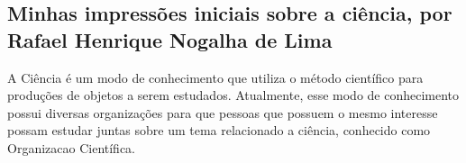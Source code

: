 \subsection{Minhas impressões iniciais sobre a ciência, por Rafael Henrique Nogalha de Lima}


A Ciência é um modo de conhecimento que utiliza o método científico para produções de objetos a serem estudados. Atualmente, esse modo de conhecimento possui diversas organizações para que pessoas que possuem o mesmo interesse possam estudar juntas sobre um tema relacionado a ciência, conhecido como \gls{Organizacao} Científica.



